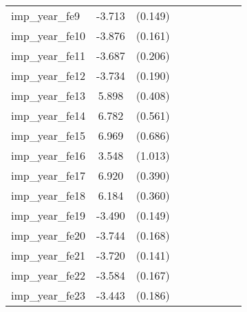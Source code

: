 {\begin{tabular}{l*{4}{cc}}
imp\_year\_fe9&   -3.713\sym{***}&  (0.149)&                  &         &                  &         &                  &         \\
imp\_year\_fe10&   -3.876\sym{***}&  (0.161)&                  &         &                  &         &                  &         \\
imp\_year\_fe11&   -3.687\sym{***}&  (0.206)&                  &         &                  &         &                  &         \\
imp\_year\_fe12&   -3.734\sym{***}&  (0.190)&                  &         &                  &         &                  &         \\
imp\_year\_fe13&    5.898\sym{***}&  (0.408)&                  &         &                  &         &                  &         \\
imp\_year\_fe14&    6.782\sym{***}&  (0.561)&                  &         &                  &         &                  &         \\
imp\_year\_fe15&    6.969\sym{***}&  (0.686)&                  &         &                  &         &                  &         \\
imp\_year\_fe16&    3.548\sym{***}&  (1.013)&                  &         &                  &         &                  &         \\
imp\_year\_fe17&    6.920\sym{***}&  (0.390)&                  &         &                  &         &                  &         \\
imp\_year\_fe18&    6.184\sym{***}&  (0.360)&                  &         &                  &         &                  &         \\
imp\_year\_fe19&   -3.490\sym{***}&  (0.149)&                  &         &                  &         &                  &         \\
imp\_year\_fe20&   -3.744\sym{***}&  (0.168)&                  &         &                  &         &                  &         \\
imp\_year\_fe21&   -3.720\sym{***}&  (0.141)&                  &         &                  &         &                  &         \\
imp\_year\_fe22&   -3.584\sym{***}&  (0.167)&                  &         &                  &         &                  &         \\
imp\_year\_fe23&   -3.443\sym{***}&  (0.186)&                  &         &                  &         &                  &         \\

\end{tabular}}

